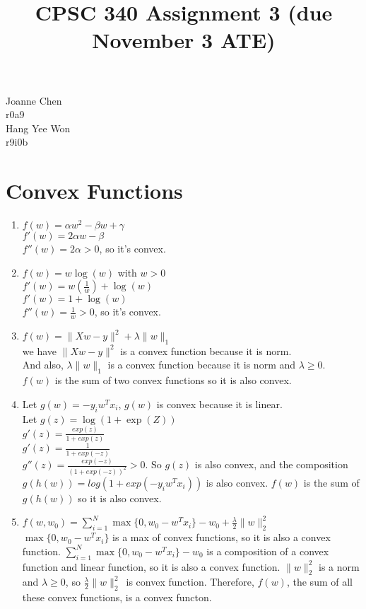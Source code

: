 \documentclass{article}
\def\norm#1{\|#1\|}
\def\enum#1{\begin{enumerate}#1\end{enumerate}}
\begin{document}
\title{CPSC 340 Assignment 3 (due November 3 ATE)}
\author{}
\date{}
\maketitle
\vspace{-4em}

Joanne Chen\\
r0a9\\

Hang Yee Won\\
r9i0b\\

\section{Convex Functions}

\enum{
\item $f(w) = \alpha w^2 - \beta w + \gamma$\\
         $f'(w) = 2\alpha w  - \beta $\\
          $f''(w) = 2\alpha   >0  $, so it's convex.
\item $f(w) = w\log(w) $ with $w > 0$\\ 
       $f'(w) = w(\frac{1}{w})+ \log(w) $\\
       $f'(w) = 1+ \log(w) $ \\
       $f''(w) = \frac{1}{w}  >0 $, so it's convex.
\item $f(w) = \norm{Xw-y}^2 + \lambda\norm{w}_1$ \\
        we have $ \norm{Xw-y}^2$ is a convex function because it is norm.\\
       And also, $\lambda\norm{w}_1$  is a convex function because it is norm and $\lambda \geq 0$.\\ $f(w)$ is the sum of two convex functions so it is also convex. 
\item Let $g(w) = -y_iw^Tx_i$, $g(w)$ is convex because it is linear.\\
      Let  $g(z) = \log(1+\exp(Z))$\\
        $g'(z) = \frac{exp(z)}{1+exp(z)}$\\
         $g'(z) = \frac{1}{1+exp(-z)}$\\
        $g''(z) =  \frac{exp(-z)}{(1+exp(-z))^2}   > 0 $. So $g(z)$ is also convex, and the composition $g(h(w)) = log(1+exp(-y_iw^Tx_i))$ is also convex. $f(w)$ is the sum of $g(h(w))$ so it is also convex.
\item $f(w,w_0) = \sum_{i=1}^N\max\{0,w_0 - w^Tx_i\} - w_0 + \frac{\lambda}{2}\norm{w}_2^2$\\
        $\max\{0,w_0 - w^Tx_i\} $ is a max of convex functions, so it is also a convex function. $\sum_{i=1}^N\max\{0,w_0 - w^Tx_i\} - w_0  $ is a composition of a convex function and linear function, so it is also a convex function. $\norm{w}_2^2$ is a norm and $\lambda \geq 0$, so $ \frac{\lambda}{2}\norm{w}_2^2$\ is convex function.
Therefore, $f(w)$, the sum of all these convex functions, is a convex functon.
}
\end{document}
